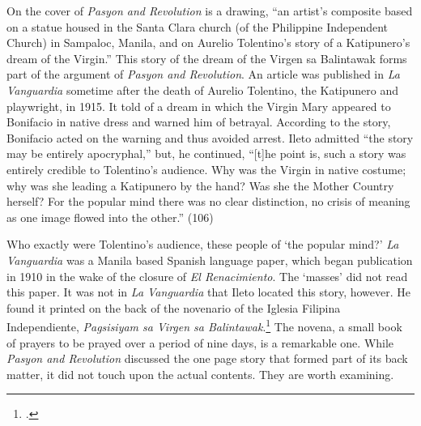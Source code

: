 On the cover of \textit{Pasyon and Revolution} is a drawing, \enquote{an artist’s composite based on a statue housed in the Santa Clara church (of the Philippine Independent Church) in Sampaloc, Manila, and on Aurelio Tolentino's story of a Katipunero's dream of the Virgin.} This story of the dream of the Virgen sa Balintawak forms part of the argument of \textit{Pasyon and Revolution}. An article was published in \textit{La Vanguardia} sometime after the death of Aurelio Tolentino, the Katipunero and playwright, in 1915. It told of a dream in which the Virgin Mary appeared to Bonifacio in native dress and warned him of betrayal. According to the story, Bonifacio acted on the warning and thus avoided arrest. Ileto admitted \enquote{the story may be entirely apocryphal,} but, he continued, \enquote{[t]he point is, such a story was entirely credible to Tolentino's audience. Why was the Virgin in native costume; why was she leading a Katipunero by the hand? Was she the Mother Country herself? For the popular mind there was no clear distinction, no crisis of meaning as one image flowed into the other.} (106)

Who exactly were Tolentino's audience, these people of \enquote*{the popular mind?} \textit{La Vanguardia} was a Manila based Spanish language paper, which began publication in 1910 in the wake of the closure of \textit{El Renacimiento}. The \enquote*{masses} did not read this paper. It was not in \textit{La Vanguardia} that Ileto located this story, however. He found it printed on the back of the novenario of the Iglesia Filipina Independiente, \textit{Pagsisiyam sa Virgen sa Balintawak}.\footcite{AglipayYLabayan1925} The novena, a small book of prayers to be prayed over a period of nine days, is a remarkable one. While \textit{Pasyon and Revolution} discussed the one page story that formed part of its back matter, it did not touch upon the actual contents. They are worth examining.


